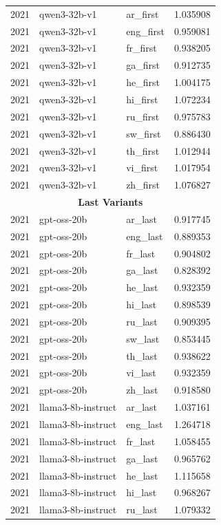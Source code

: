 \begin{tabular}{lllr}
2021 & qwen3-32b-v1 & ar\_first & 1.035908 \\
2021 & qwen3-32b-v1 & eng\_first & 0.959081 \\
2021 & qwen3-32b-v1 & fr\_first & 0.938205 \\
2021 & qwen3-32b-v1 & ga\_first & 0.912735 \\
2021 & qwen3-32b-v1 & he\_first & 1.004175 \\
2021 & qwen3-32b-v1 & hi\_first & 1.072234 \\
2021 & qwen3-32b-v1 & ru\_first & 0.975783 \\
2021 & qwen3-32b-v1 & sw\_first & 0.886430 \\
2021 & qwen3-32b-v1 & th\_first & 1.012944 \\
2021 & qwen3-32b-v1 & vi\_first & 1.017954 \\
2021 & qwen3-32b-v1 & zh\_first & 1.076827 \\
\midrule
\multicolumn{4}{c}{\textbf{Last Variants}} \\
\midrule
2021 & gpt-oss-20b & ar\_last & 0.917745 \\
2021 & gpt-oss-20b & eng\_last & 0.889353 \\
2021 & gpt-oss-20b & fr\_last & 0.904802 \\
2021 & gpt-oss-20b & ga\_last & 0.828392 \\
2021 & gpt-oss-20b & he\_last & 0.932359 \\
2021 & gpt-oss-20b & hi\_last & 0.898539 \\
2021 & gpt-oss-20b & ru\_last & 0.909395 \\
2021 & gpt-oss-20b & sw\_last & 0.853445 \\
2021 & gpt-oss-20b & th\_last & 0.938622 \\
2021 & gpt-oss-20b & vi\_last & 0.932359 \\
2021 & gpt-oss-20b & zh\_last & 0.918580 \\
2021 & llama3-8b-instruct & ar\_last & 1.037161 \\
2021 & llama3-8b-instruct & eng\_last & 1.264718 \\
2021 & llama3-8b-instruct & fr\_last & 1.058455 \\
2021 & llama3-8b-instruct & ga\_last & 0.965762 \\
2021 & llama3-8b-instruct & he\_last & 1.115658 \\
2021 & llama3-8b-instruct & hi\_last & 0.968267 \\
2021 & llama3-8b-instruct & ru\_last & 1.079332 \\

\end{tabular}
